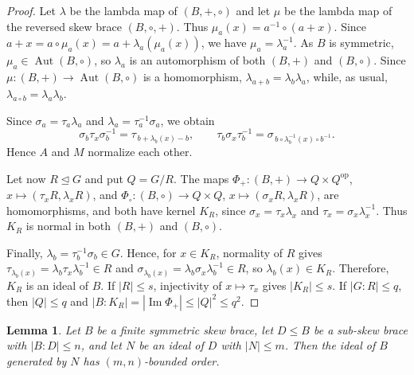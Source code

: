 \documentclass[11pt, oneside]{amsart}
\numberwithin{equation}{section}
\theoremstyle{plain}
\newtheorem{lem}[equation]{Lemma}
\theoremstyle{definition}
\newcommand{\Aut}{\operatorname{Aut} }
\begin{document}
\begin{proof}
Let $\lambda$ be the lambda map of $(B,+,\circ)$ and let $\mu$ be the lambda map of the reversed skew brace $(B,\circ,+)$. Thus $\mu_a(x)=a^{-1}\circ(a+x)$. Since $a+x=a\circ\mu_a(x)=a+\lambda_a(\mu_a(x))$, we have $\mu_a=\lambda_a^{-1}$. As $B$ is symmetric, $\mu_a\in\Aut(B,\circ)$, so $\lambda_a$ is an automorphism of both $(B,+)$ and $(B,\circ)$. Since $\mu:(B,+)\to\Aut(B,\circ)$ is a homomorphism, $\lambda_{a+b}=\lambda_b\lambda_a$, while, as usual, $\lambda_{a\circ b}=\lambda_a\lambda_b$.

Since $\sigma_a=\tau_a\lambda_a$ and $\lambda_a=\tau_a^{-1}\sigma_a$, we obtain
$$
\sigma_b\tau_x\sigma_b^{-1}=\tau_{\,b+\lambda_b(x)-b},\qquad
\tau_b\sigma_x\tau_b^{-1}=\sigma_{\,b\circ\lambda_b^{-1}(x)\circ b^{-1}}.
$$
Hence $A$ and $M$ normalize each other.

Let now $R\unlhd G$ and put $Q=G/R$. The maps $\Phi_+:(B,+)\to Q\times Q^{\mathrm{op}}$, $x\mapsto(\tau_xR,\lambda_xR)$, and $\Phi_\circ:(B,\circ)\to Q\times Q$, $x\mapsto(\sigma_xR,\lambda_xR)$, are homomorphisms, and both have kernel $K_R$, since $\sigma_x=\tau_x\lambda_x$ and $\tau_x=\sigma_x\lambda_x^{-1}$. Thus $K_R$ is normal in both $(B,+)$ and $(B,\circ)$.

Finally, $\lambda_b=\tau_b^{-1}\sigma_b\in G$. Hence, for $x\in K_R$, normality of $R$ gives $\tau_{\lambda_b(x)}=\lambda_b\tau_x\lambda_b^{-1}\in R$ and $\sigma_{\lambda_b(x)}=\lambda_b\sigma_x\lambda_b^{-1}\in R$, so $\lambda_b(x)\in K_R$. Therefore, $K_R$ is an ideal of $B$. If $|R|\leqslant s$, injectivity of $x\mapsto\tau_x$ gives $|K_R|\leqslant s$. If $|G:R|\leqslant q$, then $|Q|\leqslant q$ and $|B:K_R|=|\operatorname{Im}\Phi_+|\leqslant |Q|^2\leqslant q^2$.
\end{proof}

\begin{lem}\label{lem:bounded-ideal-closure-symmetric}
Let $B$ be a finite symmetric skew brace, let $D\leqslant B$ be a sub-skew brace with $|B:D|\leqslant n$, and let $N$ be an ideal of $D$ with $|N|\leqslant m$. Then the ideal of $B$ generated by $N$ has $(m,n)$-bounded order.
\end{lem}
\end{document}
